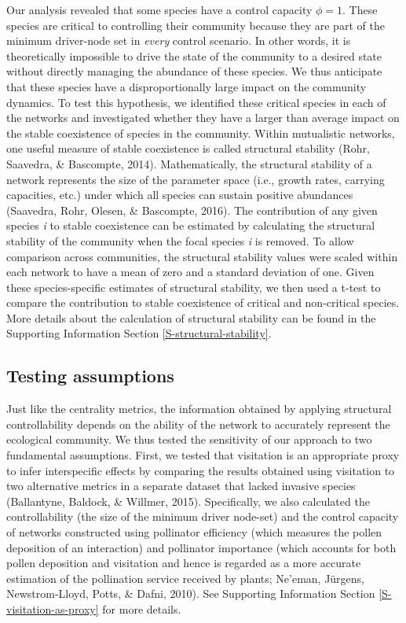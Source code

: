 \documentclass[a4paper]{artikel1}
\newcommand{\R}[1]{\label{#1}\linelabel{#1}}
\theoremstyle{definition}
\theoremstyle{definition}
\theoremstyle{definition}
\theoremstyle{remark}
\begin{document}
Our analysis revealed that some species have a control capacity
\(\phi = 1\). These species are critical to controlling their community
because they are part of the minimum driver-node set in \emph{every}
control scenario. In other words, it is theoretically impossible to
drive the state of the community to a desired state without directly
managing the abundance of these species. We thus anticipate that these
species have a disproportionally large impact on the community dynamics.
To test this hypothesis, we identified these critical species in each of
the networks and investigated whether they have a larger than average
impact on the stable coexistence of species in the community. Within
mutualistic networks, one useful measure of stable coexistence is called
structural stability (Rohr, Saavedra, \& Bascompte, 2014).
Mathematically, the structural stability of a network represents the
size of the parameter space (i.e., growth rates, carrying capacities,
etc.) under which all species can sustain positive abundances (Saavedra,
Rohr, Olesen, \& Bascompte, 2016). The contribution of any given species
\emph{i} to stable coexistence can be estimated by calculating the
structural stability of the community when the focal species \emph{i} is
removed. To allow comparison across communities, the structural
stability values were scaled within each network to have a mean of zero
and a standard deviation of one. Given these species-specific estimates
of structural stability, we then used a t-test to compare the
contribution to stable coexistence of critical and non-critical species.
More details about the calculation of structural stability can be found
in the Supporting Information Section \ref{S-structural-stability}.

\subsection{Testing assumptions}\label{testing-assumptions}

Just like the centrality metrics, the information obtained by applying
structural controllability depends on the ability of the network to
accurately represent the ecological community. We thus tested the
sensitivity of our approach to two fundamental assumptions. First, we
tested that visitation is an appropriate proxy to infer interspecific
effects by comparing the results obtained using visitation to two
alternative metrics in a separate dataset that lacked invasive species
(Ballantyne, Baldock, \& Willmer, 2015). Specifically, we also
calculated the controllability (the size of the minimum driver node-set)
and the control capacity of networks constructed using pollinator
efficiency (which measures the pollen deposition of an interaction) and
pollinator importance (which accounts for both pollen deposition and
visitation and hence is regarded as a more accurate estimation of the
pollination service received by plants; Ne'eman, Jürgens,
Newstrom-Lloyd, Potts, \& Dafni, 2010). \R{R2-sentence-fragment} See
Supporting Information Section \ref{S-visitation-as-proxy} for more
details.
\end{document}
